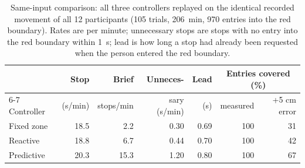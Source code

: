 \begin{table}[!t]
\centering
\caption{Same-input comparison: all three controllers replayed on the identical
recorded movement of all 12 participants (105 trials, 206~min, 970 entries into
the red boundary). Rates are per minute; unnecessary stops are stops with no
entry into the red boundary within 1~s; lead is how long a stop had already been
requested when the person entered the red boundary.}
\label{tab:same-input}
\footnotesize
\setlength{\tabcolsep}{3pt}
\begin{tabular}{@{}lrrrrrr@{}}
\toprule
 & Stop & Brief & Unneces- & Lead & \multicolumn{2}{c}{Entries covered (\%)} \\
\cmidrule(l){6-7}
Controller & (s/min) & stops/min & sary (s/min) & (s) & measured & +5 cm error \\
\midrule
Fixed zone & 18.5 & 2.2 & 0.30 & 0.69 & 100 & 31 \\
Reactive & 18.8 & 6.7 & 0.44 & 0.70 & 100 & 42 \\
Predictive & 20.3 & 15.3 & 1.20 & 0.80 & 100 & 67 \\
\bottomrule
\end{tabular}
\end{table}
